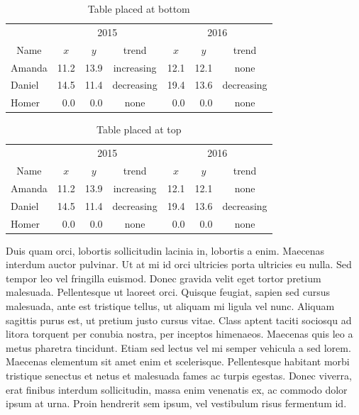 \documentclass[a4paper,10pt]{article}
\begin{document}
\begin{table}[b!]
\label{table:bottom}
\begin{center}
\begin{tabular}{l | r r c | r r c } \toprule[0.2pt]
  \multicolumn{1}{c}{}& \multicolumn{3}{c}{2015} & \multicolumn{3}{c}{2016} \\
  \multicolumn{1}{c}{Name}
  & \multicolumn{1}{c}{$x$} & \multicolumn{1}{c}{$y$} & \multicolumn{1}{c}{trend}
  & \multicolumn{1}{c}{$x$} & \multicolumn{1}{c}{$y$} & \multicolumn{1}{c}{trend} \\
  \midrule[2pt]
  Amanda  & 11.2 & 13.9 & increasing & 12.1 & 12.1 & none \\
  Daniel  & 14.5 & 11.4 & decreasing & 19.4 & 13.6 & decreasing \\
  Homer   &  0.0 &  0.0 & none       &  0.0 &  0.0 & none \\
\bottomrule[0.2pt]
\end{tabular}
\caption{Table placed at bottom}
\end{center}
\end{table}



\begin{table}[t]
\label{table:top}
\begin{center}
\begin{tabular}{l  r r c  r r c }
  & \multicolumn{3}{c}{2015} & \multicolumn{3}{c}{2016} \\
  \multicolumn{1}{c}{Name}
  & \multicolumn{1}{c}{$x$} & \multicolumn{1}{c}{$y$} & trend
  & \multicolumn{1}{c}{$x$} & \multicolumn{1}{c}{$y$} & trend \\
  \cmidrule[1.2pt](r){1-1} \cmidrule[1.2pt](lr){2-4} \cmidrule[1.2pt](l){5-7}
  Amanda  & 11.2 & 13.9 & increasing & 12.1 & 12.1 & none \\
  Daniel  & 14.5 & 11.4 & decreasing & 19.4 & 13.6 & decreasing \\
  Homer   &  0.0 &  0.0 & none       &  0.0 &  0.0 & none \\
\bottomrule[0.2pt]
\end{tabular}
\end{center}
\caption{Table placed at top}
\end{table}

Duis quam orci, lobortis sollicitudin lacinia in, lobortis a enim. Maecenas interdum auctor pulvinar.
Ut at mi id orci ultricies porta ultricies eu nulla. Sed tempor leo vel fringilla euismod. Donec gravida velit
eget tortor pretium malesuada. Pellentesque ut laoreet orci. Quisque feugiat, sapien sed cursus malesuada,
ante est tristique tellus, ut aliquam mi ligula vel nunc. Aliquam sagittis purus est, ut pretium justo cursus vitae.
Class aptent taciti sociosqu ad litora torquent per conubia nostra, per inceptos himenaeos.
Maecenas quis leo a metus pharetra tincidunt. Etiam sed lectus vel mi semper vehicula a sed lorem.
Maecenas elementum sit amet enim et scelerisque.
Pellentesque habitant morbi tristique senectus et netus et malesuada fames ac turpis egestas.
Donec viverra, erat finibus interdum sollicitudin, massa enim venenatis ex, ac commodo dolor ipsum at urna.
Proin hendrerit sem ipsum, vel vestibulum risus fermentum id.
\end{document}
